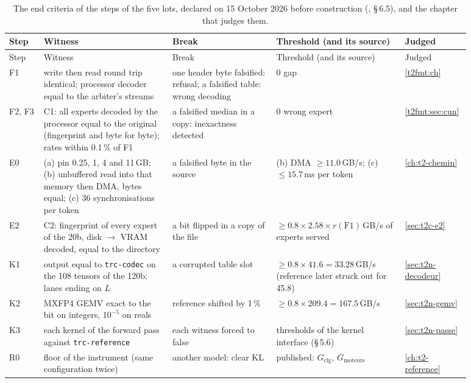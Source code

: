 \begin{longtable}{@{}p{0.07\linewidth}p{0.26\linewidth}p{0.21\linewidth}p{0.26\linewidth}p{0.08\linewidth}@{}}
\caption[The end criteria of the steps]{The end criteria of the steps of the five lots, declared on 15 October 2026 before construction (, \S\,6.5), and the chapter that judges them.}\label{t2ann:tab:etapes}\\
\toprule
Step & Witness & Break & Threshold (and its source) & Judged \\
\midrule
\endfirsthead
\toprule
Step & Witness & Break & Threshold (and its source) & Judged \\
\midrule
\endhead
F1 & write then read round trip identical; processor decoder equal to the arbiter's streams & one header byte falsified: refusal; a falsified table: wrong decoding & 0 gap & \cref{t2fmt:ch} \\
F2, F3 & C1: all experts decoded by the processor equal to the original (fingerprint and byte for byte); rates within 0.1\,\% of F1 & a falsified median in a copy: inexactness detected & 0 wrong expert & \cref{t2fmt:sec:cun} \\
E0 & (a) pin 0.25, 1, 4 and 11\,GB; (b) unbuffered read into that memory then DMA, bytes equal; (c) 36 synchronisations per token & a falsified byte in the source & (b) DMA $\ge 11.0$\,GB/s; (c) $\le 15.7$\,ms per token & \cref{ch:t2-chemin} \\
E2 & C2: fingerprint of every expert of the 20b, disk $\to$ VRAM decoded, equal to the directory & a bit flipped in a copy of the file & $\ge 0.8 \times 2.58 \times r(\mathrm{F1})$\,GB/s of experts served & \cref{sec:t2c-e2} \\
K1 & output equal to \texttt{trc-codec} on the 108 tensors of the 120b; lanes ending on $L$ & a corrupted table slot & $\ge 0.8 \times 41.6 = 33.28$\,GB/s (reference later struck out for 45.8) & \cref{sec:t2n-decodeur} \\
K2 & MXFP4 GEMV exact to the bit on integers, $10^{-5}$ on reals & reference shifted by 1\,\% & $\ge 0.8 \times 209.4 = 167.5$\,GB/s & \cref{sec:t2n-gemv} \\
K3 & each kernel of the forward pass against \texttt{trc-reference} & each witness forced to false & thresholds of the kernel interface (\S\,5.6) & \cref{sec:t2n-passe} \\
R0 & floor of the instrument (same configuration twice) & another model: clear KL & published: $G_{\text{cfg}}$, $G_{\text{moteurs}}$ & \cref{ch:t2-reference} \\

\end{longtable}
